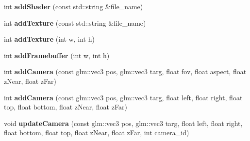 \begin{DoxyCompactItemize}
\item 
\hypertarget{classRenderEngine_a01111caa3ceac70b47d4698d385be616}{int {\bfseries add\-Shader} (const std\-::string \&file\-\_\-name)}\label{classRenderEngine_a01111caa3ceac70b47d4698d385be616}

\item 
\hypertarget{classRenderEngine_a72e7ae94ed84b1f315dbc7feba575906}{int {\bfseries add\-Texture} (const std\-::string \&file\-\_\-name)}\label{classRenderEngine_a72e7ae94ed84b1f315dbc7feba575906}

\item 
\hypertarget{classRenderEngine_ac598a7edb8a61d32c4e67b865c52363a}{int {\bfseries add\-Texture} (int w, int h)}\label{classRenderEngine_ac598a7edb8a61d32c4e67b865c52363a}

\item 
\hypertarget{classRenderEngine_aae0fc84b1f6e4f35d819d813bb5637fa}{int {\bfseries add\-Framebuffer} (int w, int h)}\label{classRenderEngine_aae0fc84b1f6e4f35d819d813bb5637fa}

\item 
\hypertarget{classRenderEngine_ae05748829c0984debd2bae3678af81f7}{int {\bfseries add\-Camera} (const glm\-::vec3 pos, glm\-::vec3 targ, float fov, float aspect, float z\-Near, float z\-Far)}\label{classRenderEngine_ae05748829c0984debd2bae3678af81f7}

\item 
\hypertarget{classRenderEngine_afcae23444d512d63f2c6bf1fed181e7b}{int {\bfseries add\-Camera} (const glm\-::vec3 pos, glm\-::vec3 targ, float left, float right, float top, float bottom, float z\-Near, float z\-Far)}\label{classRenderEngine_afcae23444d512d63f2c6bf1fed181e7b}

\item 
\hypertarget{classRenderEngine_ac1ebe6afb6fa4491aced904a4792dde0}{void {\bfseries update\-Camera} (const glm\-::vec3 pos, glm\-::vec3 targ, float left, float right, float bottom, float top, float z\-Near, float z\-Far, int camera\-\_\-id)}\label{classRenderEngine_ac1ebe6afb6fa4491aced904a4792dde0}

\end{DoxyCompactItemize}
